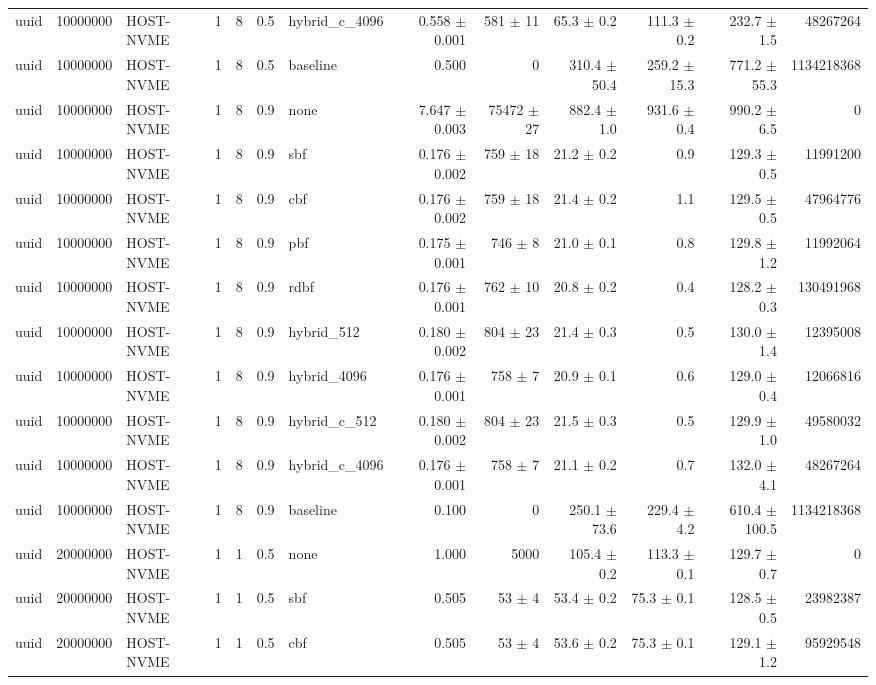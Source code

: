 \begin{tabular}{lllllllrrrrrr}
uuid & 10000000 & HOST-NVME & 1 & 8 & 0.5 & hybrid\_c\_4096 & 0.558 $\pm$ 0.001 & 581 $\pm$ 11 & 65.3 $\pm$ 0.2 & 111.3 $\pm$ 0.2 & 232.7 $\pm$ 1.5 & 48267264 \\
uuid & 10000000 & HOST-NVME & 1 & 8 & 0.5 & baseline & 0.500 & 0 & 310.4 $\pm$ 50.4 & 259.2 $\pm$ 15.3 & 771.2 $\pm$ 55.3 & 1134218368 \\
uuid & 10000000 & HOST-NVME & 1 & 8 & 0.9 & none & 7.647 $\pm$ 0.003 & 75472 $\pm$ 27 & 882.4 $\pm$ 1.0 & 931.6 $\pm$ 0.4 & 990.2 $\pm$ 6.5 & 0 \\
uuid & 10000000 & HOST-NVME & 1 & 8 & 0.9 & sbf & 0.176 $\pm$ 0.002 & 759 $\pm$ 18 & 21.2 $\pm$ 0.2 & 0.9 & 129.3 $\pm$ 0.5 & 11991200 \\
uuid & 10000000 & HOST-NVME & 1 & 8 & 0.9 & cbf & 0.176 $\pm$ 0.002 & 759 $\pm$ 18 & 21.4 $\pm$ 0.2 & 1.1 & 129.5 $\pm$ 0.5 & 47964776 \\
uuid & 10000000 & HOST-NVME & 1 & 8 & 0.9 & pbf & 0.175 $\pm$ 0.001 & 746 $\pm$ 8 & 21.0 $\pm$ 0.1 & 0.8 & 129.8 $\pm$ 1.2 & 11992064 \\
uuid & 10000000 & HOST-NVME & 1 & 8 & 0.9 & rdbf & 0.176 $\pm$ 0.001 & 762 $\pm$ 10 & 20.8 $\pm$ 0.2 & 0.4 & 128.2 $\pm$ 0.3 & 130491968 \\
uuid & 10000000 & HOST-NVME & 1 & 8 & 0.9 & hybrid\_512 & 0.180 $\pm$ 0.002 & 804 $\pm$ 23 & 21.4 $\pm$ 0.3 & 0.5 & 130.0 $\pm$ 1.4 & 12395008 \\
uuid & 10000000 & HOST-NVME & 1 & 8 & 0.9 & hybrid\_4096 & 0.176 $\pm$ 0.001 & 758 $\pm$ 7 & 20.9 $\pm$ 0.1 & 0.6 & 129.0 $\pm$ 0.4 & 12066816 \\
uuid & 10000000 & HOST-NVME & 1 & 8 & 0.9 & hybrid\_c\_512 & 0.180 $\pm$ 0.002 & 804 $\pm$ 23 & 21.5 $\pm$ 0.3 & 0.5 & 129.9 $\pm$ 1.0 & 49580032 \\
uuid & 10000000 & HOST-NVME & 1 & 8 & 0.9 & hybrid\_c\_4096 & 0.176 $\pm$ 0.001 & 758 $\pm$ 7 & 21.1 $\pm$ 0.2 & 0.7 & 132.0 $\pm$ 4.1 & 48267264 \\
uuid & 10000000 & HOST-NVME & 1 & 8 & 0.9 & baseline & 0.100 & 0 & 250.1 $\pm$ 73.6 & 229.4 $\pm$ 4.2 & 610.4 $\pm$ 100.5 & 1134218368 \\
uuid & 20000000 & HOST-NVME & 1 & 1 & 0.5 & none & 1.000 & 5000 & 105.4 $\pm$ 0.2 & 113.3 $\pm$ 0.1 & 129.7 $\pm$ 0.7 & 0 \\
uuid & 20000000 & HOST-NVME & 1 & 1 & 0.5 & sbf & 0.505 & 53 $\pm$ 4 & 53.4 $\pm$ 0.2 & 75.3 $\pm$ 0.1 & 128.5 $\pm$ 0.5 & 23982387 \\
uuid & 20000000 & HOST-NVME & 1 & 1 & 0.5 & cbf & 0.505 & 53 $\pm$ 4 & 53.6 $\pm$ 0.2 & 75.3 $\pm$ 0.1 & 129.1 $\pm$ 1.2 & 95929548 \\

\end{tabular}
